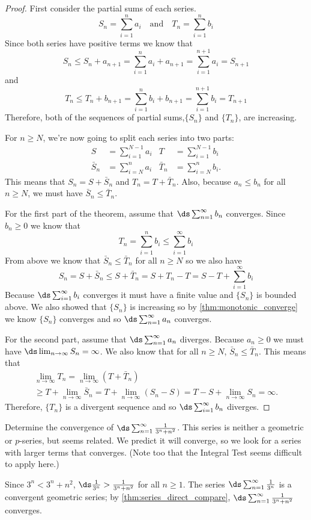 \begin{proof}
First consider the partial sums of each series.
\[S_n=\sum_{i=1}^n a_i \quad \text{and} \quad T_n=\sum_{i=1}^n b_i\]
Since both series have positive terms we know that
\[S_n\leq S_n+a_{n+1}=\sum_{i=1}^n a_i+a_{n+1}=\sum_{i=1}^{n+1} a_i=S_{n+1}\]
and
\[T_n\leq T_n+b_{n+1}=\sum_{i=1}^n b_i+b_{n+1}=\sum_{i=1}^{n+1} b_i=T_{n+1}\]
Therefore, both of the sequences of partial sums,$\{S_n\}$ and $\{T_n\}$, are increasing.

For $n\ge N$, we're now going to split each series into two parts:
\begin{align*}
S&=\sum_{i=1}^{N-1}a_i & T&=\sum_{i=1}^{N-1}b_i \\
\bar S_n&=\sum_{i=N}^n a_i & \bar T_n&=\sum_{i=N}^n b_i.
\end{align*}
This means that $S_n=S+\bar S_n$ and $T_n=T+\bar T_n$.
Also, because $a_n\leq b_n$ for all $n\geq N$, we must have $\bar S_n\leq\bar T_n$.

For the first part of the theorem, assume that $\ds \sum_{n=1}^\infty b_n$ converges. Since $b_n\geq 0$ we know that 
\[T_n=\sum_{i=1}^n b_i\leq \sum_{i=1}^\infty b_i\]
From above we know that $\bar S_n\leq\bar T_n$ for all $n\geq N$ so we also have
\[S_n=S+\bar S_n\le S+\bar T_n=S+T_n-T=S-T+\sum_{i=1}^\infty b_i\]
Because $\ds \sum_{i=1}^\infty b_i$ converges it must have a finite value and $\{S_n\}$ is bounded above. We also showed that $\{S_n\}$ is increasing so by \autoref{thm:monotonic_converge} we know $\{S_n\}$ converges and so $\ds \sum_{n=1}^\infty a_n$ converges.

For the second part, assume that $\ds\sum_{n=1}^\infty a_n$ diverges. Because $a_n\geq 0$ we must have $\ds\lim_{n\to\infty} S_n=\infty$. We also know that for all $n\ge N$, $\bar S_n\leq\bar T_n$.  This means that
\begin{multline*}
\lim_{n\to \infty} T_n=\lim_{n\to \infty}(T+\bar T_n)\\
\ge T+\lim_{n\to \infty}\bar S_n=T+\lim_{n\to \infty}(S_n-S)
=T-S+\lim_{n\to \infty}S_n=\infty.
\end{multline*}
Therefore, $\{T_n\}$ is a divergent sequence and so $\ds \sum_{i=1}^\infty b_n$ diverges.
\end{proof}


\begin{example}\label{ex_dct1}
Determine the convergence of $\ds\sum_{n=1}^\infty \frac1{3^n+n^2}$.
\solution
This series is neither a geometric or $p$-series, but seems related. We predict it will converge, so we look for a series with larger terms that converges. (Note too that the Integral Test seems difficult to apply here.)

Since $3^n < 3^n+n^2$, $\ds \frac1{3^n}> \frac1{3^n+n^2}$ for all $n\geq1$. The series $\ds\sum_{n=1}^\infty \frac{1}{3^n}$ is a convergent geometric series; by \autoref{thm:series_direct_compare}, $\ds \sum_{n=1}^\infty \frac1{3^n+n^2}$ converges.
\end{example}

